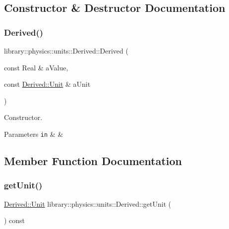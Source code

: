 \subsection{Constructor \& Destructor Documentation}
\mbox{\label{classlibrary_1_1physics_1_1units_1_1_derived_a526996552af20a987c045ced9bd87fc7}} 
\subsubsection{\texorpdfstring{Derived()}{Derived()}}
{\footnotesize\ttfamily library\+::physics\+::units\+::\+Derived\+::\+Derived (\begin{DoxyParamCaption}\item[{const Real \&}]{a\+Value,  }\item[{const \hyperlink{classlibrary_1_1physics_1_1units_1_1_derived_1_1_unit}{Derived\+::\+Unit} \&}]{a\+Unit }\end{DoxyParamCaption})}



Constructor. 


\begin{DoxyCode}
\end{DoxyCode}



\begin{DoxyParams}[1]{Parameters}
\mbox{\tt in}  & {\em } & \\
\hline
\end{DoxyParams}


\subsection{Member Function Documentation}
\mbox{\label{classlibrary_1_1physics_1_1units_1_1_derived_a020b4ab6cb1d2ed73b01cde2bf1aab0e}} 
\subsubsection{\texorpdfstring{get\+Unit()}{getUnit()}}
{\footnotesize\ttfamily \hyperlink{classlibrary_1_1physics_1_1units_1_1_derived_1_1_unit}{Derived\+::\+Unit} library\+::physics\+::units\+::\+Derived\+::get\+Unit (\begin{DoxyParamCaption}{ }\end{DoxyParamCaption}) const}

